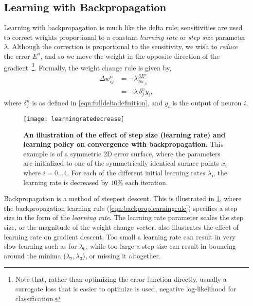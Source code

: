 \documentclass[thesis]{subfiles}
\begin{document}
\subsection{Learning with Backpropagation}
Learning with backpropagation is much like the delta rule; sensitivities are used to correct weights proportional to a constant \emph{learning rate} or \emph{step size} parameter $\lambda$. Although the correction is proportional to the sensitivity, we wish to \emph{reduce} the error $E^n$, and so we move the weight in the opposite direction of the gradient~\footnote{Note that, rather than optimizing the error function directly, usually a surrogate loss that is easier to optimize is used, \ie negative log-likelihood for classification.}. Formally, the weight change rule is given by,
\begin{equation}
\begin{aligned}
    \Delta w^n_{ij} &= -\lambda \frac{\partial E^n}{\partial w_{ji}}\\
    &= -\lambda \, \delta^n_j y_i,
     \label{eqn:backproplearningrule}
\end{aligned}
\end{equation}
where $\delta^n_j$ is as defined in \cref{eqn:fulldeltadefinition}, and $y_i$ is the output of neuron $i$.
%
\begin{figure}[tbp]
\centering
\texttt{[image: learningratedecrease]}
\caption[Learning rate and convergence]{\textbf{An illustration of the effect of step size (learning rate) and learning policy on convergence with backpropagation.} This example is of a symmetric 2D error surface, where the parameters are initialized to one of the symmetrically identical surface points $x_i$ where $i=0\ldots4$. For each of the different initial learning rates $\lambda_i$, the learning rate is decreased by $10\%$ each iteration.}\label{fig:learningrate}
\end{figure}
Backpropagation is a method of steepest descent. This is illustrated in \cref{fig:learningrate}, where the backpropagation learning rule (\cref{eqn:backproplearningrule}) specifies a step size in the form of the \emph{learning rate}. The learning rate parameter scales the step size, or the magnitude of the weight change vector.  also illustrates the effect of learning rate on gradient descent. Too small a learning rate can result in very slow learning such as for $\lambda_0$, while too large a step size can result in bouncing around the minima ($\lambda_2, \lambda_3$), or missing it altogether. 
\end{document}
